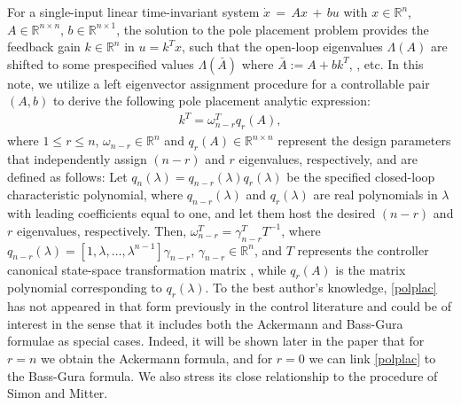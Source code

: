 \documentclass[conference]{IEEEtran}
\newcommand{\om}{\omega}
\begin{document}
For a single-input linear time-invariant system
$\dot{x}\,=\,Ax\,+\,bu$ with $x\in\mathbb{R}^n$,
$A\in\mathbb{R}^{n\times n}$,  $b\in\mathbb{R}^{n\times 1}$, the
solution to the pole placement problem provides the feedback gain $k\in\mathbb{R}^n$ in $u=k^T x$,
such that the open-loop eigenvalues $\varLambda(A)$ are shifted to
some prespecified values $\varLambda(\bar A)$ where $\bar A :=A+bk^T$,
\cite{Kailat80, Ackermann:1972vl, SimMit68}, etc. In this note, we
utilize a left eigenvector assignment procedure for a
controllable pair $(A,b)$ to derive the following pole placement analytic expression:
\begin{align}
\label{polplac}
k^T = \omega_{n-r}^T q_r(A),\end{align}
where $1\leq r\leq n$, $\omega_{n-r}\in\mathbb{R}^n$ and
$q_r(A)\in\mathbb{R}^{n\times n}$ represent the design
parameters that independently assign $(n-r)$ and $r$ eigenvalues,
respectively, and are defined as follows: Let
$q_n(\lambda)=q_{n-r}(\lambda) q_r(\lambda)$ be the specified closed-loop
characteristic polynomial, where $q_{n-r}(\lambda)$ and
$q_{r}(\lambda)$ are real polynomials in $\lambda$ with leading
coefficients equal to one, and let them host the desired $(n-r)$ and $r$
eigenvalues, respectively. Then, $\om^T_{n-r}=\gamma^T_{n-r}T^{-1}$,
where $q_{n-r}(\lambda)=[1,\lambda,\ldots,\lambda^{n-1}]\gamma_{n-r}$,
$\gamma_{n-r}\in\mathbb{R}^{n}$,
and $T$ represents the controller canonical state-space
transformation matrix \cite{Kailat80}, while $q_r(A)$ is the matrix polynomial corresponding to $q_r(\lambda)$.
To the best author's knowledge, \eqref{polplac} has
not appeared in that form previously in the control literature and
could be of interest in the sense that it includes both the Ackermann
and Bass-Gura formulae as special cases. Indeed, it will be shown
later in the paper that for $r=n$ we obtain
the Ackermann formula,
and for $r=0$ we can link \eqref{polplac} to the Bass-Gura formula. We also
stress its close relationship to the procedure of Simon and
Mitter.
\end{document}
